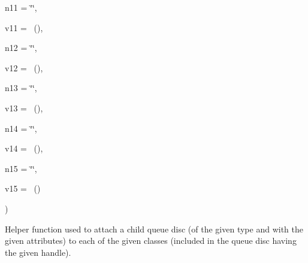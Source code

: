 {\begin{DoxyParamCaption}
\item[{std\+::string}]{n11 = {\ttfamily \char`\"{}\char`\"{}}, }
\item[{const {\bf Attribute\+Value} \&}]{v11 = {~()}, }
\item[{std\+::string}]{n12 = {\ttfamily \char`\"{}\char`\"{}}, }
\item[{const {\bf Attribute\+Value} \&}]{v12 = {~()}, }
\item[{std\+::string}]{n13 = {\ttfamily \char`\"{}\char`\"{}}, }
\item[{const {\bf Attribute\+Value} \&}]{v13 = {~()}, }
\item[{std\+::string}]{n14 = {\ttfamily \char`\"{}\char`\"{}}, }
\item[{const {\bf Attribute\+Value} \&}]{v14 = {~()}, }
\item[{std\+::string}]{n15 = {\ttfamily \char`\"{}\char`\"{}}, }
\item[{const {\bf Attribute\+Value} \&}]{v15 = {~()}}
\end{DoxyParamCaption}
)}\hypertarget{classns3_1_1TrafficControlHelper_ac50060cd07f2aa3b77d43808c775456b}{}\label{classns3_1_1TrafficControlHelper_ac50060cd07f2aa3b77d43808c775456b}
Helper function used to attach a child queue disc (of the given type and with the given attributes) to each of the given classes (included in the queue disc having the given handle).



